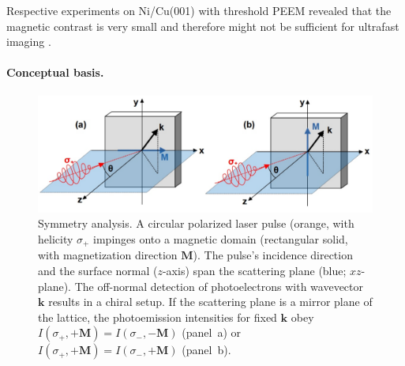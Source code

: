 \documentclass[prl,twocolumn,floatfix]{revtex4-2}
\renewcommand{\vec}[1]{\boldsymbol{#1}}
\begin{document}
Respective experiments on Ni/Cu(001) with threshold PEEM revealed that the magnetic contrast is very small and therefore might not be sufficient for ultrafast imaging .


\paragraph{Conceptual basis.} 

\begin{figure}
    \centering
    \includegraphics[width = \columnwidth]{symmetry}
    \caption{Symmetry analysis. A circular polarized laser pulse (orange, with helicity $\sigma_{+}$ impinges onto a magnetic domain (rectangular solid, with magnetization direction $\vec{M}$). The pulse's incidence direction and the surface normal ($z$-axis) span the scattering plane (blue; $xz$-plane). The off-normal detection of photoelectrons with wavevector $\vec{k}$ results in a chiral setup. If the scattering plane is a mirror plane of the lattice, the photoemission intensities for fixed $\vec{k}$ obey $I(\sigma_{+}, +\vec{M}) = I(\sigma_{-}, -\vec{M})$ (panel~a) or $I(\sigma_{+}, +\vec{M}) = I(\sigma_{-}, +\vec{M})$ (panel~b).}
    \label{fig:symmetry}
\end{figure}
\end{document}

